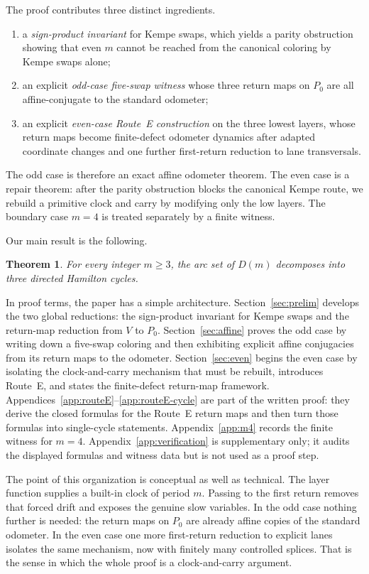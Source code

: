 \documentclass[11pt]{article}
\newtheorem{theorem}{Theorem}
\begin{document}
The proof contributes three distinct ingredients.
\begin{enumerate}[label=\textup{(\roman*)},leftmargin=2.5em]
\item a \emph{sign-product invariant} for Kempe swaps, which yields a parity obstruction showing that even $m$ cannot be reached from the canonical coloring by Kempe swaps alone;
\item an explicit \emph{odd-case five-swap witness} whose three return maps on $P_0$ are all affine-conjugate to the standard odometer;
\item an explicit \emph{even-case Route~E construction} on the three lowest layers, whose return maps become finite-defect odometer dynamics after adapted coordinate changes and one further first-return reduction to lane transversals.
\end{enumerate}

The odd case is therefore an exact affine odometer theorem.
The even case is a repair theorem: after the parity obstruction blocks the canonical Kempe route, we rebuild a primitive clock and carry by modifying only the low layers.
The boundary case $m=4$ is treated separately by a finite witness.

Our main result is the following.


\begin{theorem}\label{thm:main-all}
For every integer $m\ge 3$, the arc set of $D(m)$ decomposes into three directed Hamilton cycles.
\end{theorem}

In proof terms, the paper has a simple architecture.
Section~\ref{sec:prelim} develops the two global reductions: the sign-product invariant for Kempe swaps and the return-map reduction from $V$ to $P_0$.
Section~\ref{sec:affine} proves the odd case by writing down a five-swap coloring and then exhibiting explicit affine conjugacies from its return maps to the odometer.
Section~\ref{sec:even} begins the even case by isolating the clock-and-carry mechanism that must be rebuilt, introduces Route~E, and states the finite-defect return-map framework.
Appendices~\ref{app:routeE}--\ref{app:routeE-cycle} are part of the written proof: they derive the closed formulas for the Route~E return maps and then turn those formulas into single-cycle statements.
Appendix~\ref{app:m4} records the finite witness for $m=4$.
Appendix~\ref{app:verification} is supplementary only; it audits the displayed formulas and witness data but is not used as a proof step.

The point of this organization is conceptual as well as technical.
The layer function supplies a built-in clock of period $m$.
Passing to the first return removes that forced drift and exposes the genuine slow variables.
In the odd case nothing further is needed: the return maps on $P_0$ are already affine copies of the standard odometer.
In the even case one more first-return reduction to explicit lanes isolates the same mechanism, now with finitely many controlled splices.
That is the sense in which the whole proof is a clock-and-carry argument.
\end{document}
